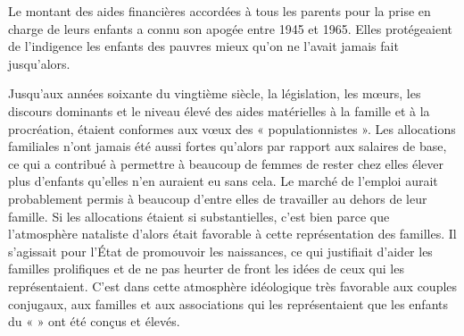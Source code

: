  Le montant des aides financières accordées à tous les parents pour la prise en charge de leurs enfants a connu son apogée entre 1945 et 1965. Elles protégeaient de l'indigence les enfants des pauvres mieux qu'on ne l'avait jamais fait jusqu'alors.  
 
 Jusqu'aux années soixante du vingtième siècle, la législation, les mœurs, les discours dominants et le niveau élevé des aides matérielles à la famille et à la procréation, étaient conformes aux vœux des « populationnistes ». Les allocations familiales n'ont jamais été aussi fortes qu'alors par rapport aux salaires de base, ce qui a contribué à permettre à beaucoup de femmes de rester chez elles élever plus d'enfants qu'elles n'en auraient eu sans cela. Le marché de l'emploi aurait probablement permis à beaucoup d'entre elles de travailler au dehors de leur famille. Si les allocations étaient si substantielles, c'est bien parce que l'atmosphère nataliste d'alors était favorable à cette représentation des familles. Il s'agissait pour l'État de promouvoir les naissances, ce qui justifiait d'aider les familles prolifiques et de ne pas heurter de front les idées de ceux qui les représentaient. C'est dans cette atmosphère idéologique très favorable aux couples conjugaux, aux familles et aux associations qui les représentaient que les enfants du «  » ont été conçus et élevés. 
 
